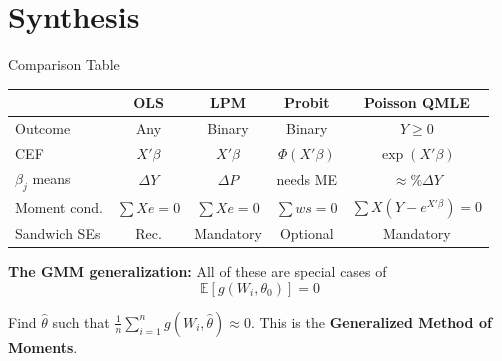 \documentclass[aspectratio=169, handout, t]{beamer}
\numberwithin{equation}{section}
\begin{document}
\section{Synthesis}

\begin{frame}{Comparison Table}

\begin{center}
\renewcommand{\arraystretch}{1.4}
\begin{tabular}{lcccc}
\toprule
& \textbf{OLS} & \textbf{LPM} & \textbf{Probit} & \textbf{Poisson QMLE} \\
\midrule
Outcome & Any & Binary & Binary & $Y \geq 0$ \\
CEF & $X'\beta$ & $X'\beta$ & $\Phi(X'\beta)$ & $\exp(X'\beta)$ \\
$\beta_j$ means & $\Delta Y$ & $\Delta P$ & needs ME & $\approx \%\Delta Y$ \\
Moment cond. & $\sum Xe = 0$ & $\sum Xe = 0$ & $\sum ws = 0$ & $\sum X(Y-e^{X'\beta})=0$ \\
Sandwich SEs & Rec. & Mandatory & Optional & \alert{Mandatory} \\
\bottomrule
\end{tabular}
\renewcommand{\arraystretch}{1.0}
\end{center}

\pause

\textbf{The GMM generalization:} All of these are special cases of
\[
\mathbb{E}[g(W_i, \theta_0)] = 0
\]

Find $\hat\theta$ such that $\frac{1}{n}\sum_{i=1}^n g(W_i, \hat\theta) \approx 0$. This is the \textbf{Generalized Method of Moments}.

\end{frame}

\end{document}
